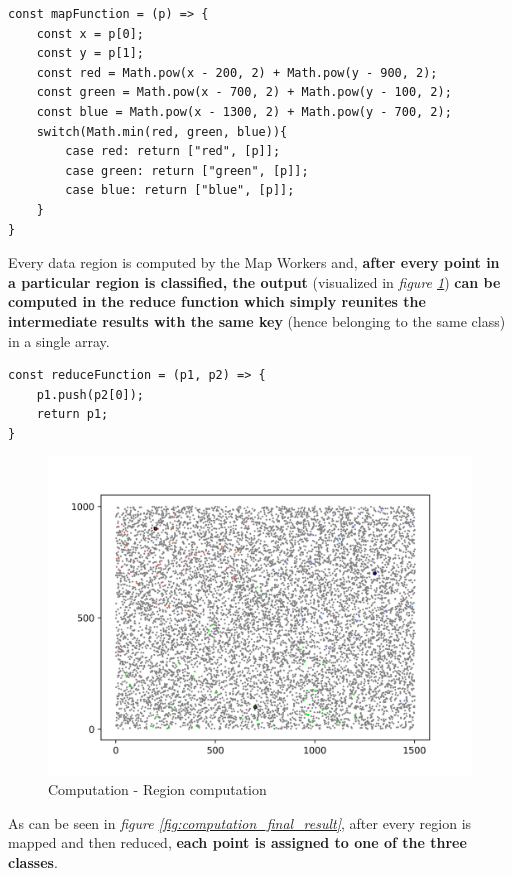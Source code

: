 \begin{lstlisting}
const mapFunction = (p) => {
    const x = p[0];
    const y = p[1];
    const red = Math.pow(x - 200, 2) + Math.pow(y - 900, 2);
    const green = Math.pow(x - 700, 2) + Math.pow(y - 100, 2);
    const blue = Math.pow(x - 1300, 2) + Math.pow(y - 700, 2);
    switch(Math.min(red, green, blue)){
        case red: return ["red", [p]];
        case green: return ["green", [p]];
        case blue: return ["blue", [p]];
    }
}
\end{lstlisting}

Every data region is computed by the Map Workers and, \textbf{after every point in a particular region is classified, the output} (visualized in \textit{figure \ref{fig:computation_region_computation}}) \textbf{can be computed in the reduce function which simply reunites the intermediate results with the same key} (hence belonging to the same class) in a single array.

\begin{lstlisting}
const reduceFunction = (p1, p2) => {
    p1.push(p2[0]);
    return p1;
}
\end{lstlisting}

\begin{figure}[!ht]
    \centering
    \includegraphics[width=\linewidth]{document/chapters/chapter_7/images/computation_region_computation.png}
    \caption{Computation - Region computation}
    \label{fig:computation_region_computation}
\end{figure}

As can be seen in \textit{figure \ref{fig:computation_final_result}}, after every region is mapped and then reduced, \textbf{each point is assigned to one of the three classes}.

